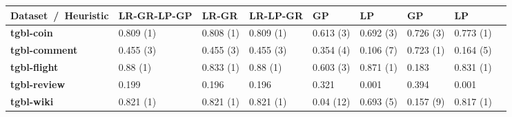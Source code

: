 \begin{tabular}{lllllllll}
\toprule
{Dataset~/~Heuristic} & LR-GR-LP-GP & LR-GR & LR-LP-GR &     GP & LP & GP & LP \\
\midrule
\textbf{tgbl-coin}      &                 0.809 (1)&                              0.808 (1) &                                               0.809  (1) &      0.613 (3) &  0.692 (3) &   0.726 (3) &  0.773 (1) \\
\textbf{tgbl-comment}   &          0.455 (3)            &                              0.455 (3) &    0.455 (3)                                                 &      0.354 (4) &  0.106 (7) &   0.723 (1) &  0.164 (5) \\
\textbf{tgbl-flight}    &                  0.88 (1) &                              0.833 (1) &                                                  0.88 (1) &      0.603 (3) &  0.871 (1) &   0.183 &  0.831 (1) \\
\textbf{tgbl-review}    &                 0.199 &                              0.196 &                                                          0.196 &      0.321 &  0.001 &   0.394 &  0.001 \\
\textbf{tgbl-wiki}      &                 0.821 (1) &                              0.821 (1) &                                                           0.821 (1) &       0.04 (12) &  0.693 (5) &   0.157 (9) &  {0.817} (1) \\
\bottomrule
\end{tabular}